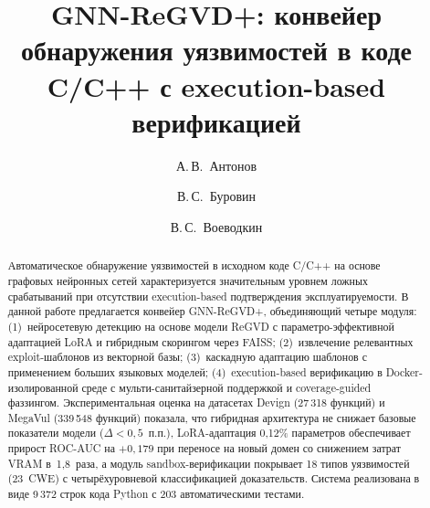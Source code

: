 \documentclass[runningheads]{llncs}
\begin{document}
\title{GNN-ReGVD+: конвейер обнаружения уязвимостей в коде C/C++ с execution-based верификацией}


\author{А.\,В.~Антонов \and
В.\,С.~Буровин \and
В.\,С.~Воеводкин}



\maketitle

\begin{abstract}
Автоматическое обнаружение уязвимостей в исходном коде C/C++ на основе графовых нейронных сетей характеризуется значительным уровнем ложных срабатываний при отсутствии execution-based подтверждения эксплуатируемости. В данной работе предлагается конвейер GNN-ReGVD+, объединяющий четыре модуля: (1)~нейросетевую детекцию на основе модели ReGVD с параметро-эффективной адаптацией LoRA и гибридным скорингом через FAISS; (2)~извлечение релевантных exploit-шаблонов из векторной базы; (3)~каскадную адаптацию шаблонов с применением больших языковых моделей; (4)~execution-based верификацию в Docker-изолированной среде с мульти-санитайзерной поддержкой и coverage-guided фаззингом. Экспериментальная оценка на датасетах Devign (27\,318 функций) и MegaVul (339\,548 функций) показала, что гибридная архитектура не снижает базовые показатели модели ($\Delta < 0{,}5$~п.п.), LoRA-адаптация 0,12\% параметров обеспечивает прирост ROC-AUC на $+0{,}179$ при переносе на новый домен со снижением затрат VRAM в~1,8~раза, а модуль sandbox-верификации покрывает 18 типов уязвимостей (23~CWE) с четырёхуровневой классификацией доказательств. Система реализована в виде 9\,372 строк кода Python с 203 автоматическими тестами.

\end{abstract}
\end{document}

